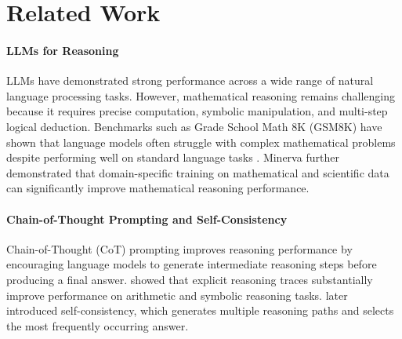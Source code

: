 \documentclass{article}
\begin{document}



\section{Related Work}
\label{sec:relatedwork}

\paragraph{LLMs for Reasoning} 
LLMs have demonstrated strong performance across a wide range of natural language processing tasks. However, mathematical reasoning remains challenging because it requires precise computation, symbolic manipulation, and multi-step logical deduction. Benchmarks such as Grade School Math 8K (GSM8K) have shown that language models often struggle with complex mathematical problems despite performing well on standard language tasks \cite{wei2022cot}. Minerva \cite{lewkowycz2022minerva} further demonstrated that domain-specific training on mathematical and scientific data can significantly improve mathematical reasoning performance.


\paragraph{Chain-of-Thought Prompting and Self-Consistency}
Chain-of-Thought (CoT) prompting improves reasoning performance by encouraging language models to generate intermediate reasoning steps before producing a final answer. \citet{wei2022cot} showed that explicit reasoning traces substantially improve performance on arithmetic and symbolic reasoning tasks. \citet{wang2022selfconsistency} later introduced self-consistency, which generates multiple reasoning paths and selects the most frequently occurring answer.
\end{document}
